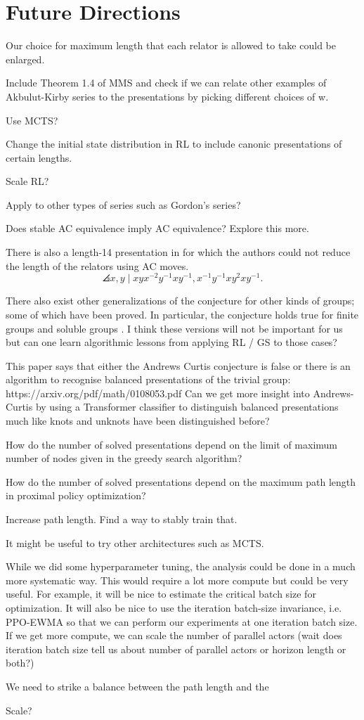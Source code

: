 
\section{Future Directions}

Our choice for maximum length that each relator is allowed to take could be enlarged. 

Include Theorem 1.4 of MMS and check if we can relate other examples of Akbulut-Kirby series to the presentations by picking different choices of w.

Use MCTS?

Change the initial state distribution in RL to include canonic presentations of certain lengths.

Scale RL?

Apply to other types of series such as Gordon's series?

Does stable AC equivalence imply AC equivalence? Explore this more.

There is also a length-14 presentation in \cite{MMS} for which the authors could not reduce the length of the relators using AC moves.
\[
\angles{x, y \mid xyx^{-2}y^{-1} xy^{-1}, x^{-1} y^{-1} x y^2 x y^{-1}}.
\]

There also exist other generalizations of the conjecture for other kinds of groups; some of which have been proved.
In particular, the conjecture holds true for finite groups and soluble groups \cite{Borovik, Guyot}.
I think these versions will not be important for us but can one learn algorithmic lessons from applying RL / GS to those cases?

 This paper says that either the Andrews Curtis conjecture is false or there is an algorithm to recognise balanced presentations of the trivial group: https://arxiv.org/pdf/math/0108053.pdf
Can we get more insight into Andrews-Curtis by using a Transformer classifier to distinguish balanced presentations much like knots and unknots have been distinguished before?

How do the number of solved presentations depend on the limit of maximum number of nodes given in the greedy search algorithm? 

How do the number of solved presentations depend on the maximum path length in proximal policy optimization?

Increase path length. Find a way to stably train that. 

It might be useful to try other architectures such as MCTS.

While we did some hyperparameter tuning, the analysis could be done in a much more systematic way. This would require a lot more compute but could be very useful. For example, it will be nice to estimate the critical batch size for optimization. It will also be nice to use the iteration batch-size invariance, i.e. PPO-EWMA so that we can perform our experiments at one iteration batch size. If we get more compute, we can scale the number of parallel actors (wait does iteration batch size tell us about number of parallel actors or horizon length or both?)

We need to strike a balance between the path length and the 

Scale?